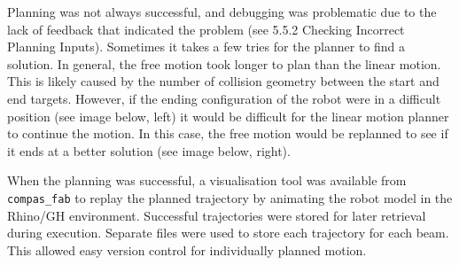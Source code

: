 Planning was not always successful, and debugging was problematic due to the lack of feedback that indicated the problem (see 5.5.2 Checking Incorrect Planning Inputs). Sometimes it takes a few tries for the planner to find a solution. In general, the free motion took longer to plan than the linear motion. This is likely caused by the number of collision geometry between the start and end targets. However, if the ending configuration of the robot were in a difficult position (see image below, left) it would be difficult for the linear motion planner to continue the motion. In this case, the free motion would be replanned to see if it ends at a better solution (see image below, right).

When the planning was successful, a visualisation tool was available from \verb|compas_fab| to replay the planned trajectory by animating the robot model in the Rhino/GH environment. Successful trajectories were stored for later retrieval during execution. Separate files were used to store each trajectory for each beam. This allowed easy version control for individually planned motion. 

